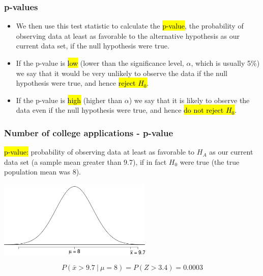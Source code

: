 \begin{frame}
\frametitle{p-values}

\begin{itemize}

\item We then use this test statistic to calculate the \hl{p-value}, the probability of observing data at least as favorable to the alternative hypothesis as our current data set, if the null hypothesis were true.

\pause

\item If the p-value is \hl{low} (lower than the significance level, $\alpha$, which is usually 5\%) we say that it would be very unlikely to observe the data if the null hypothesis were true, and hence \hl{reject $H_0$}.

\pause

\item If the p-value is \hl{high} (higher than $\alpha$) we say that it is likely to observe the data even if the null hypothesis were true, and hence \hl{do not reject $H_0$}.

\end{itemize}

\end{frame}


\begin{frame}
\frametitle{Number of college applications - p-value}

\hl{p-value:} probability of observing data at least as favorable to $H_A$ as our current data set (a sample mean greater than 9.7), if in fact $H_0$ were true (the true population mean was 8).

\begin{center}
\includegraphics[width=0.55\textwidth]{4-3_hyp_test/figures/app/app_pval_gr}
\end{center}

\pause

\[ P(\bar{x} > 9.7~|~\mu = 8) = P(Z > 3.4) = 0.0003 \]

\end{frame}

